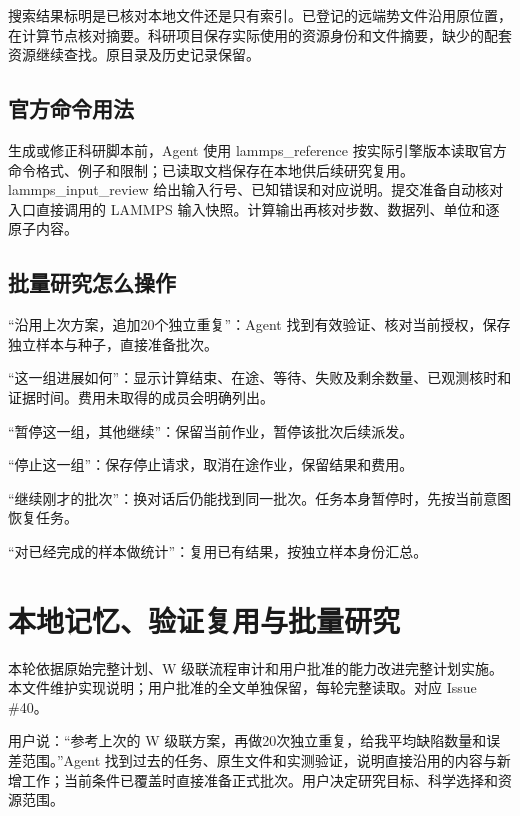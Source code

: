 \documentclass[11pt,a4paper]{ctexart}
\begin{document}
搜索结果标明是已核对本地文件还是只有索引。已登记的远端势文件沿用原位置，在计算节点核对摘要。科研项目保存实际使用的资源身份和文件摘要，缺少的配套资源继续查找。原目录及历史记录保留。



\subsection{官方命令用法}


生成或修正科研脚本前，Agent 使用 lammps\_\allowbreak{}reference 按实际引擎版本读取官方命令格式、例子和限制；已读取文档保存在本地供后续研究复用。lammps\_\allowbreak{}input\_\allowbreak{}review 给出输入行号、已知错误和对应说明。提交准备自动核对入口直接调用的 LAMMPS 输入快照。计算输出再核对步数、数据列、单位和逐原子内容。



\subsection{批量研究怎么操作}


\noindent\textbullet\quad “沿用上次方案，追加20个独立重复”：Agent 找到有效验证、核对当前授权，保存独立样本与种子，直接准备批次。


\noindent\textbullet\quad “这一组进展如何”：显示计算结束、在途、等待、失败及剩余数量、已观测核时和证据时间。费用未取得的成员会明确列出。


\noindent\textbullet\quad “暂停这一组，其他继续”：保留当前作业，暂停该批次后续派发。


\noindent\textbullet\quad “停止这一组”：保存停止请求，取消在途作业，保留结果和费用。


\noindent\textbullet\quad “继续刚才的批次”：换对话后仍能找到同一批次。任务本身暂停时，先按当前意图恢复任务。


\noindent\textbullet\quad “对已经完成的样本做统计”：复用已有结果，按独立样本身份汇总。


\clearpage
\section{本地记忆、验证复用与批量研究}


本轮依据原始完整计划、W 级联流程审计和用户批准的能力改进完整计划实施。本文件维护实现说明；用户批准的全文单独保留，每轮完整读取。对应 Issue \#40。



用户说：“参考上次的 W 级联方案，再做20次独立重复，给我平均缺陷数量和误差范围。”Agent 找到过去的任务、原生文件和实测验证，说明直接沿用的内容与新增工作；当前条件已覆盖时直接准备正式批次。用户决定研究目标、科学选择和资源范围。
\end{document}
